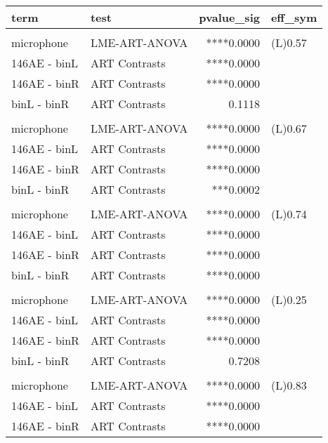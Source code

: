 \begin{table}
\fontsize{12.0pt}{14.4pt}\selectfont
\begin{tabular*}{\linewidth}{@{\extracolsep{\fill}}llrl}
\toprule
term & test & pvalue\_sig & eff\_sym \\ 
\midrule\addlinespace[2.5pt]
\multicolumn{4}{l}{LAS} \\[2.5pt] 
\midrule\addlinespace[2.5pt]
microphone & LME-ART-ANOVA & ****0.0000 & (L)0.57 \\ 
146AE - binL & ART Contrasts & ****0.0000 &  \\ 
146AE - binR & ART Contrasts & ****0.0000 &  \\ 
binL - binR & ART Contrasts &  0.1118 &  \\ 
\midrule\addlinespace[2.5pt]
\multicolumn{4}{l}{LAS10} \\[2.5pt] 
\midrule\addlinespace[2.5pt]
microphone & LME-ART-ANOVA & ****0.0000 & (L)0.67 \\ 
146AE - binL & ART Contrasts & ****0.0000 &  \\ 
146AE - binR & ART Contrasts & ****0.0000 &  \\ 
binL - binR & ART Contrasts & ***0.0002 &  \\ 
\midrule\addlinespace[2.5pt]
\multicolumn{4}{l}{LAS50} \\[2.5pt] 
\midrule\addlinespace[2.5pt]
microphone & LME-ART-ANOVA & ****0.0000 & (L)0.74 \\ 
146AE - binL & ART Contrasts & ****0.0000 &  \\ 
146AE - binR & ART Contrasts & ****0.0000 &  \\ 
binL - binR & ART Contrasts & ****0.0000 &  \\ 
\midrule\addlinespace[2.5pt]
\multicolumn{4}{l}{LASmax} \\[2.5pt] 
\midrule\addlinespace[2.5pt]
microphone & LME-ART-ANOVA & ****0.0000 & (L)0.25 \\ 
146AE - binL & ART Contrasts & ****0.0000 &  \\ 
146AE - binR & ART Contrasts & ****0.0000 &  \\ 
binL - binR & ART Contrasts &  0.7208 &  \\ 
\midrule\addlinespace[2.5pt]
\multicolumn{4}{l}{LCS} \\[2.5pt] 
\midrule\addlinespace[2.5pt]
microphone & LME-ART-ANOVA & ****0.0000 & (L)0.83 \\ 
146AE - binL & ART Contrasts & ****0.0000 &  \\ 
146AE - binR & ART Contrasts & ****0.0000 &  \\ 

\end{tabular*}
\end{table}
